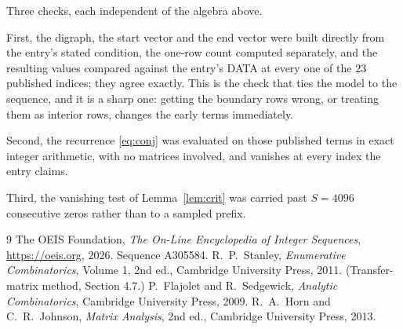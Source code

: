 \documentclass[11pt,a4paper]{article}
\theoremstyle{plain}
\theoremstyle{definition}
\begin{document}
Three checks, each independent of the algebra above.

First, the digraph, the start vector and the end vector were built directly from the
entry's stated condition, the one-row count computed separately, and the resulting values
compared against the entry's DATA at every one of the $23$ published indices; they
agree exactly. This is the check that ties the model to the sequence, and it is a sharp one:
getting the boundary rows wrong, or treating them as interior rows, changes the early terms
immediately.

Second, the recurrence \eqref{eq:conj} was evaluated on those published terms in exact
integer arithmetic, with no matrices involved, and vanishes at every index the entry claims.

Third, the vanishing test of Lemma~\ref{lem:crit} was carried past $S=4096$ consecutive
zeros rather than to a sampled prefix.

\begin{thebibliography}{9}
 The OEIS Foundation, \emph{The On-Line Encyclopedia of Integer
Sequences}, \url{https://oeis.org}, 2026. Sequence A305584.
 R.~P.~Stanley, \emph{Enumerative Combinatorics}, Volume 1, 2nd ed.,
Cambridge University Press, 2011. (Transfer-matrix method, Section 4.7.)
 P.~Flajolet and R.~Sedgewick, \emph{Analytic Combinatorics}, Cambridge
University Press, 2009.
 R.~A.~Horn and C.~R.~Johnson, \emph{Matrix Analysis}, 2nd ed., Cambridge
University Press, 2013.
\end{thebibliography}
\end{document}
